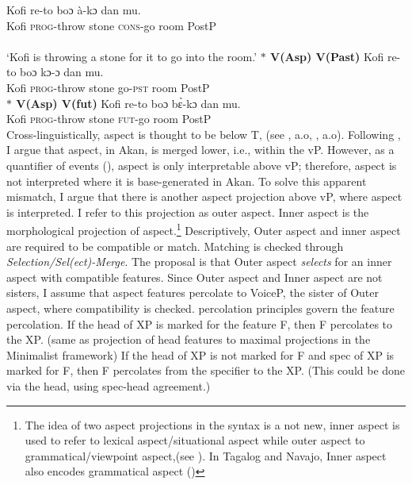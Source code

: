 \documentclass[output=paper,colorlinks,citecolor=brown]{langscibook}
\begin{document}
\ea\label{ex041} 
\gll Kofi re-to boɔ \`a-kɔ dan mu.\\
	Kofi \textsc{prog}-throw stone \textsc{cons}-go room PostP\\
	 \\
\glt `Kofi is throwing a stone for it to go into the room.'
\z 
\ex\label{ex051}
\textbf{$\ast$ \phantom {} {} {}  V(Asp)\phantom {} {} {}   V(Past)} 
     \ea\label{ex7} 
\gll * Kofi re-to boɔ kɔ-ɔ dan mu.\\
	{} Kofi \textsc{prog}-throw  stone  go-\textsc{pst} room PostP\\
\z 
\ex\label{ex061}
\textbf{$\ast$ \phantom {} {} {}  V(Asp)\phantom {} {} {}   V(fut)} 
     \ea\label{ex1} 
\gll * Kofi re-to boɔ  b\`{ɛ}-kɔ dan mu.\\
	{} Kofi \textsc{prog}-throw stone  \textsc{fut}-go room PostP\\

\z 
\z \z Cross-linguistically, aspect is thought to be below T, (see \citet{Rizzi2004} \citet{Rizzi2013Notes}, a.o, \citet{Cinque2002, Cinque2006}, \citet{RizziCinque2016} \citet{CinqueRizzi2010} a.o). Following \citet{Kandybowicz2010, Kandybowicz2015}, I argue that aspect, in Akan, is merged lower, i.e., within the vP.  However, as a quantifier of events (\citet{Hacquard2006}), aspect is only interpretable above vP; therefore, aspect is not interpreted where it is base-generated in Akan. To solve this apparent mismatch, I argue that there is another aspect projection above vP, where aspect is interpreted. I refer to this projection as outer aspect. Inner aspect is the morphological projection of aspect.\footnote{The idea of two aspect projections in the syntax is a not new, inner aspect is used to refer to lexical aspect/situational aspect while outer aspect to grammatical/viewpoint aspect,(see \citealt{Travis2010, Travis1991, Smith1991, MacDonald2006}). In Tagalog and Navajo, Inner aspect also encodes grammatical aspect (\citet{Travis2010})} Descriptively, Outer aspect and inner aspect are required to be compatible or match. Matching is checked through \textit{Selection/Sel(ect)-Merge}. The proposal is that Outer aspect \textit{selects} for an inner aspect with compatible features. Since Outer aspect and Inner aspect are not sisters, 
I assume that aspect features percolate to VoiceP, the sister of Outer aspect, where compatibility is checked.  percolation principles govern the feature percolation. \nocite{Webelhuth1992}
\ea \label{ex16}
\ea If the head of XP is marked for the feature F, then F percolates to the XP. (same as projection of head features to maximal projections in the Minimalist framework)
\ex If the head of XP is not marked for F and spec of XP is marked for F, then F percolates from the specifier to the XP. (This could be done via the head, using spec-head agreement.)
\end{document}
